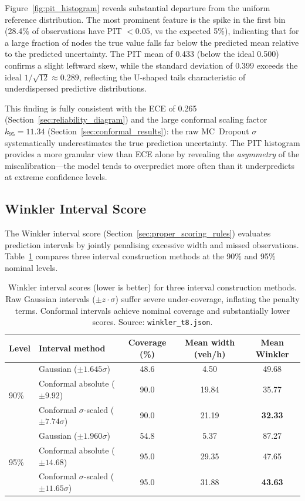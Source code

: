 Figure~\ref{fig:pit_histogram} reveals substantial departure from the uniform reference distribution. The most prominent feature is the spike in the first bin (28.4\% of observations have PIT $< 0.05$, vs the expected 5\%), indicating that for a large fraction of nodes the true value falls far below the predicted mean relative to the predicted uncertainty. The PIT mean of 0.433 (below the ideal 0.500) confirms a slight leftward skew, while the standard deviation of 0.399 exceeds the ideal $1/\sqrt{12} \approx 0.289$, reflecting the U-shaped tails characteristic of underdispersed predictive distributions.

This finding is fully consistent with the ECE of 0.265 (Section~\ref{sec:reliability_diagram}) and the large conformal scaling factor $k_{95} = 11.34$ (Section~\ref{sec:conformal_results}): the raw MC~Dropout $\sigma$ systematically underestimates the true prediction uncertainty. The PIT histogram provides a more granular view than ECE alone by revealing the \emph{asymmetry} of the miscalibration---the model tends to overpredict more often than it underpredicts at extreme confidence levels.

\subsection{Winkler Interval Score}\label{sec:winkler_results}

The Winkler interval score (Section~\ref{sec:proper_scoring_rules}) evaluates prediction intervals by jointly penalising excessive width and missed observations. Table~\ref{tab:winkler_results} compares three interval construction methods at the 90\% and 95\% nominal levels.

\begin{table}[htbp]
\centering
\caption[Winkler interval scores for Gaussian, conformal absolute, and conformal sigma-scaled intervals]{Winkler interval scores (lower is better) for three interval construction methods. Raw Gaussian intervals ($\pm z \cdot \sigma$) suffer severe under-coverage, inflating the penalty terms. Conformal intervals achieve nominal coverage and substantially lower scores. Source: \texttt{winkler\_t8.json}.}
\label{tab:winkler_results}
\footnotesize
\begin{tabular}{llccc}
\toprule
\textbf{Level} & \textbf{Interval method} & \textbf{Coverage (\%)} & \textbf{Mean width (veh/h)} & \textbf{Mean Winkler} \\
\midrule
\multirow{3}{*}{90\%}
& Gaussian ($\pm 1.645\sigma$) & 48.6 & 4.50 & 49.68 \\
& Conformal absolute ($\pm 9.92$) & 90.0 & 19.84 & 35.77 \\
& Conformal $\sigma$-scaled ($\pm 7.74\sigma$) & 90.0 & 21.19 & \textbf{32.33} \\
\midrule
\multirow{3}{*}{95\%}
& Gaussian ($\pm 1.960\sigma$) & 54.8 & 5.37 & 87.27 \\
& Conformal absolute ($\pm 14.68$) & 95.0 & 29.35 & 47.65 \\
& Conformal $\sigma$-scaled ($\pm 11.65\sigma$) & 95.0 & 31.88 & \textbf{43.63} \\
\bottomrule
\end{tabular}
\end{table}

